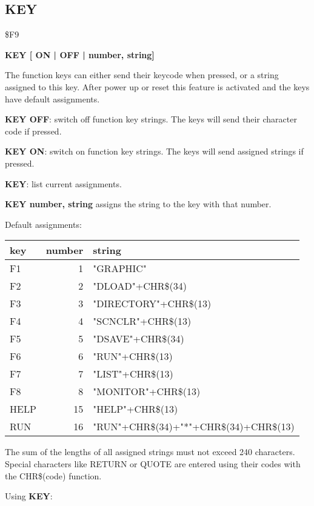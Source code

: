 \subsection{KEY}
\begin{description}[leftmargin=3cm,style=nextline]
\item [Token:] \$F9
\item [Format:] {\bf KEY [ ON | OFF | number, string]}
\item [Usage:] The function keys can either send their keycode
               when pressed, or a string assigned to this key.
               After power up or reset this feature is activated
               and the keys have default assignments.

               {\bf KEY OFF}: switch off function key strings.
               The keys will send their character code if pressed.

               {\bf KEY ON}: switch on function key strings.
               The keys will send assigned strings if pressed.

               {\bf KEY}: list current assignments.

               {\bf KEY number, string} assigns the string to
               the key with that number.

               Default assignments:

{\setlength{\tabcolsep}{1mm}
\ttfamily
\begin{tabular}{|l|r|l|}
\hline
  key  & number & string \\
\hline
F1     &  1 & "GRAPHIC" \\
F2     &  2 & "DLOAD"+CHR\$(34) \\
F3     &  3 & "DIRECTORY"+CHR\$(13) \\
F4     &  4 & "SCNCLR"+CHR\$(13) \\
F5     &  5 & "DSAVE"+CHR\$(34) \\
F6     &  6 & "RUN"+CHR\$(13) \\
F7     &  7 & "LIST"+CHR\$(13) \\
F8     &  8 & "MONITOR"+CHR\$(13) \\
HELP   & 15 & "HELP"+CHR\$(13) \\
RUN    & 16 & "RUN"+CHR\$(34)+"*"+CHR\$(34)+CHR\$(13) \\
\hline
\end{tabular}
}

\item [Remarks:] The sum of the lengths of all assigned strings
                 must not exceed 240 characters.
                 Special characters like RETURN or QUOTE are entered
                 using their codes with the CHR\$(code) function.
\item [Example:] Using {\bf KEY}:
\end{description}


